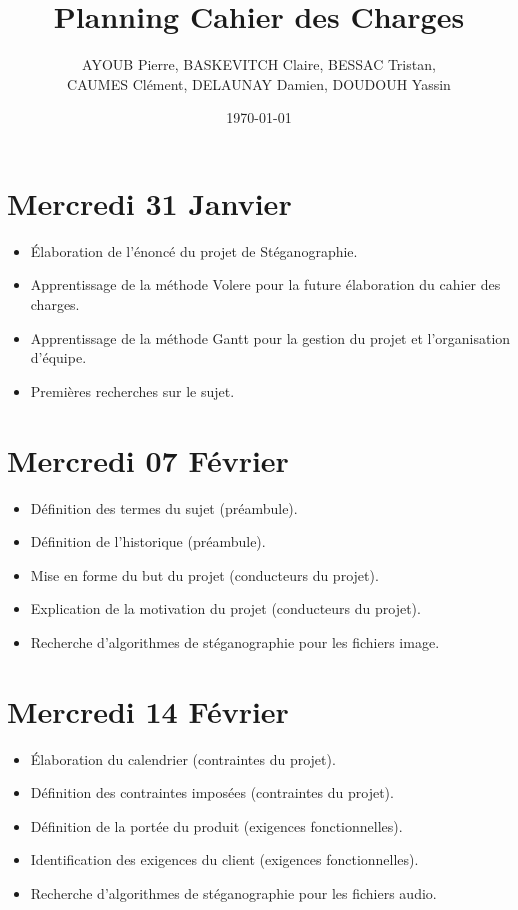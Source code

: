\documentclass[11pt]{article}
\title{Planning Cahier des Charges}
\author{AYOUB Pierre, BASKEVITCH Claire, BESSAC Tristan, \\
CAUMES Clément, DELAUNAY Damien, DOUDOUH Yassin}
\date\today
\begin{document}
\maketitle

\section{Mercredi 31 Janvier}
\begin {itemize}
\item Élaboration de l'énoncé du projet de Stéganographie.
\item Apprentissage de la méthode Volere pour la future élaboration du cahier des charges.
\item Apprentissage de la méthode Gantt pour la gestion du projet et l'organisation d'équipe.
\item Premières recherches sur le sujet.
\end{itemize}

\section{Mercredi 07 Février}
\begin {itemize}
\item Définition des termes du sujet (préambule).
\item Définition de l'historique (préambule).
\item Mise en forme du but du projet (conducteurs du projet).
\item Explication de la motivation du projet (conducteurs du projet).
\item Recherche d'algorithmes de stéganographie pour les fichiers image.
\end{itemize}

\section{Mercredi 14 Février}
\begin {itemize}
\item Élaboration du calendrier (contraintes du projet).
\item Définition des contraintes imposées (contraintes du projet).
\item Définition de la portée du produit (exigences fonctionnelles).
\item Identification des exigences du client (exigences fonctionnelles).
\item Recherche d'algorithmes de stéganographie pour les fichiers audio.
\end{itemize}
\end{document}
